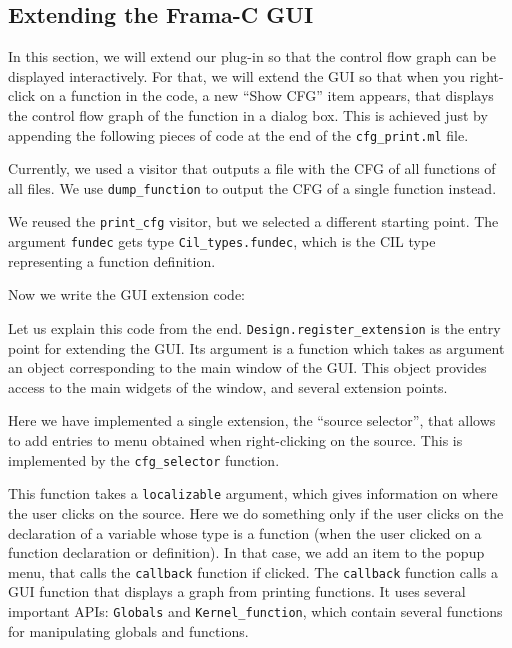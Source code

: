 \subsection{Extending the Frama-C GUI}
\label{tut2:gui}

In this section, we will extend our plug-in so that the control flow
graph can be displayed interactively. For that, we will extend the \framac GUI
so that when you right-click on a function in the code, a new ``Show
CFG'' item appears, that displays the control flow graph of the
function in a dialog box. This is achieved just by appending the following
pieces of code at the end of the \texttt{cfg\_print.ml} file.

Currently, we used a visitor that outputs a \dottool file with the CFG of
all functions of all files. We use \texttt{dump\_function} to output
the CFG of a single function instead.


We reused the \texttt{print\_cfg} visitor, but we selected a different
starting point. The argument \texttt{fundec} gets type
\texttt{Cil\_types.fundec}, which is the CIL type
representing a function definition.

Now we write the GUI extension code:


Let us explain this code from the end. \texttt{Design.register\_extension} is
the entry point for extending the GUI. Its argument is a function which takes as
argument an object corresponding to the main window of the \framac GUI. This
object provides access to the main widgets of the window, and several
extension points.

Here we have implemented a single extension, the ``source selector'',
that allows to add entries to menu obtained when right-clicking on the
source. This is implemented by the \texttt{cfg\_selector} function.

This function takes a \texttt{localizable} argument, which gives information on
where the user clicks on the source. Here we do something only if the user
clicks on the declaration of a variable whose type is a function (\ie when the
user clicked on a function declaration or definition).  In that case, we add an
item to the popup menu, that calls the \texttt{callback} function if
clicked. The \texttt{callback} function calls a \framac GUI function that
displays a graph from \dottool printing functions. It uses several important \framac
APIs: \texttt{Globals} and \texttt{Kernel\_function}, which contain several
functions for manipulating globals and functions.


